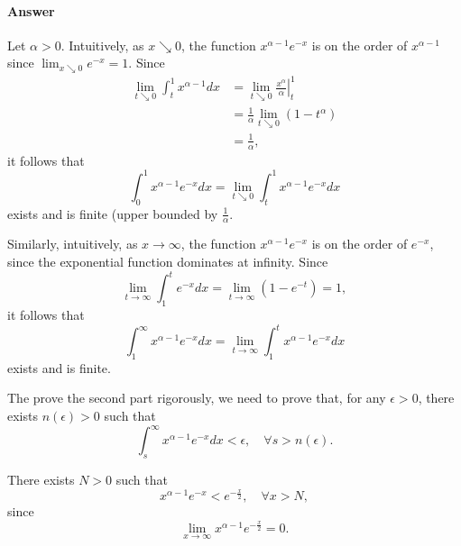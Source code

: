 \paragraph{Answer}
Let $ \alpha > 0 $.
Intuitively, as $ x \searrow 0 $, the function $ x^{\alpha - 1} e^{-x} $ is on
    the order of $ x^{\alpha - 1} $ since $ \lim_{x \searrow 0} e^{-x} = 1 $.
Since
\begin{align*}
    \lim_{t \searrow 0} \int_{t}^{1} x^{\alpha - 1} dx
        &= \lim_{t \searrow 0} \left. \frac{x^\alpha}{\alpha}  \right|_t^1 \\
        &= \frac{1}{\alpha} \lim_{t \searrow 0} (1 - t^\alpha) \\
        &= \frac{1}{\alpha},
\end{align*}
it follows that
\begin{equation*}
    \int_{0}^{1} x^{\alpha - 1} e^{-x} dx =
        \lim_{t \searrow 0} \int_{t}^{1} x^{\alpha - 1} e^{-x} dx
\end{equation*}
exists and is finite (upper bounded by $ \frac{1}{\alpha} $.

Similarly, intuitively, as $ x \rightarrow \infty $, the function
    $ x^{\alpha - 1} e^{-x} $ is on the order of $ e^{-x} $, since the
    exponential function dominates at infinity.
Since
\begin{equation*}
    \lim_{t \rightarrow \infty} \int_{1}^{t} e^{-x} dx =
        \lim_{t \rightarrow \infty} (1 - e^{-t}) = 1,
\end{equation*}
it follows that
\begin{equation*}
    \int_{1}^{\infty} x^{\alpha - 1} e^{-x} dx =
        \lim_{t \rightarrow \infty} \int_{1}^{t} x^{\alpha - 1} e^{-x} dx
\end{equation*}
exists and is finite.

The prove the second part rigorously, we need to prove that, for any
    $ \epsilon > 0 $, there exists $ n(\epsilon) > 0 $ such that
\begin{equation*}
    \int_{s}^{\infty} x^{\alpha - 1} e^{-x} dx < \epsilon, \quad
        \forall s > n(\epsilon).
\end{equation*}

There exists $ N > 0 $ such that
\begin{equation*}
    x^{\alpha - 1} e^{-x} < e^{-\frac{x}{2}}, \quad \forall x > N,
\end{equation*}
since
\begin{equation*}
    \lim_{x \rightarrow \infty} x^{\alpha - 1} e^{-\frac{x}{2}} = 0.
\end{equation*}

